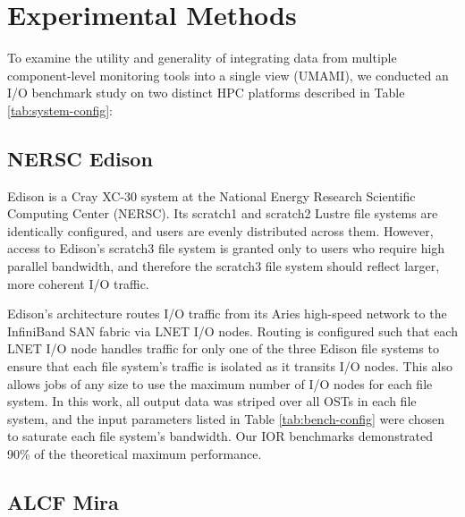 

\section{Experimental Methods} \label{sec:platforms}

To examine the utility and generality of integrating data from multiple
component-level monitoring tools into a single view (UMAMI), we conducted an
I/O benchmark study on two distinct HPC platforms described in Table \ref{tab:system-config}:



\subsection{NERSC Edison} \label{sec:platforms/edison}

Edison is a Cray XC-30 system at the National Energy Research Scientific
Computing Center (NERSC).
Its scratch1 and scratch2 Lustre file systems are identically configured,
and users are evenly distributed across them.
However, access to Edison's scratch3 file system is granted only to users who require high parallel bandwidth, and therefore the scratch3 file system should reflect larger, more coherent I/O traffic.

Edison's architecture routes I/O traffic from its Aries high-speed network
to the InfiniBand SAN fabric via LNET I/O nodes.
Routing is configured such that each LNET I/O node handles traffic for only one of the three Edison file systems to ensure that each file system's traffic is isolated as it transits I/O nodes.
This also allows jobs of any size to use the maximum number of I/O nodes for each file system.
In this work, all output data was striped over all OSTs in each file system, and the input parameters listed in Table \ref{tab:bench-config} were chosen to saturate each file system's bandwidth.
Our IOR benchmarks demonstrated 90\% of the theoretical maximum performance.

\subsection{ALCF Mira} \label{sec:platforms/mira}

